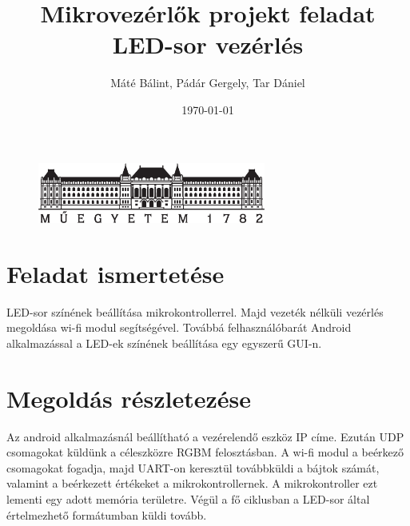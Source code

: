 \documentclass[12pt]{extarticle}
\title{\huge Mikrovezérlők projekt feladat\\[10pt]
	\Large LED-sor vezérlés}
\date{\today}
\author{Máté Bálint, Pádár Gergely, Tar Dániel }
\begin{document}
	
	\begin{titlepage}
		
		\maketitle
		\thispagestyle{fancy}
		
		\begin{figure}
			\begin{center}
				\includegraphics[height=2cm]{logo_bme_kicsi.eps}
			\end{center}
		\end{figure}
		
	\end{titlepage}
	
	
	\newpage
	\tableofcontents
	
	
	\newpage
	
	
	\section{Feladat ismertetése}
	
	LED-sor színének beállítása mikrokontrollerrel. Majd vezeték nélküli vezérlés megoldása wi-fi modul segítségével. Továbbá felhasználóbarát Android alkalmazással a LED-ek színének beállítása egy egyszerű GUI-n.
	
	\section{Megoldás részletezése}
	
	Az android alkalmazásnál beállítható a vezérelendő eszköz IP címe. Ezután UDP csomagokat küldünk a céleszközre RGBM felosztásban. A wi-fi modul a beérkező csomagokat fogadja, majd UART-on keresztül továbbküldi a bájtok számát, valamint a beérkezett értékeket a mikrokontrollernek. A mikrokontroller ezt lementi egy adott memória területre. Végül a fő ciklusban a LED-sor által értelmezhető formátumban küldi tovább. 
	
\end{document}
